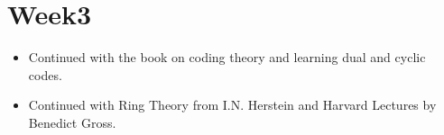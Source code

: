 \section{Week3}
\begin{itemize}
    \item Continued with the book on coding theory and learning dual and cyclic codes.
    \item Continued with Ring Theory from I.N. Herstein and Harvard Lectures by Benedict Gross.
\end{itemize}

